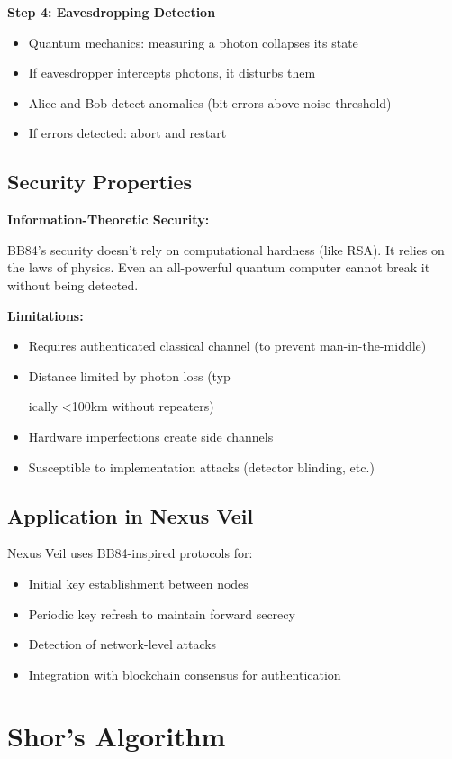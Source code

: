 \documentclass[12pt,oneside]{book}
\begin{document}
\textbf{Step 4: Eavesdropping Detection}
\begin{itemize}
\item Quantum mechanics: measuring a photon collapses its state
\item If eavesdropper intercepts photons, it disturbs them
\item Alice and Bob detect anomalies (bit errors above noise threshold)
\item If errors detected: abort and restart
\end{itemize}

\subsection{Security Properties}

\textbf{Information-Theoretic Security:}

BB84's security doesn't rely on computational hardness (like RSA). It relies on the laws of physics. Even an all-powerful quantum computer cannot break it without being detected.

\textbf{Limitations:}
\begin{itemize}
\item Requires authenticated classical channel (to prevent man-in-the-middle)
\item Distance limited by photon loss (typ

ically <100km without repeaters)
\item Hardware imperfections create side channels
\item Susceptible to implementation attacks (detector blinding, etc.)
\end{itemize}

\subsection{Application in Nexus Veil}

Nexus Veil uses BB84-inspired protocols for:
\begin{itemize}
\item Initial key establishment between nodes
\item Periodic key refresh to maintain forward secrecy
\item Detection of network-level attacks
\item Integration with blockchain consensus for authentication
\end{itemize}

\section{Shor's Algorithm}
\end{document}
